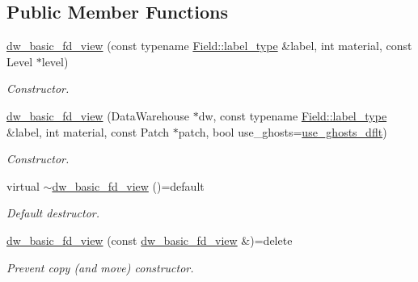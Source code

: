 \subsection*{Public Member Functions}
\begin{DoxyCompactItemize}
\item 
\hyperlink{classUintah_1_1PhaseField_1_1detail_1_1dw__basic__fd__view_3_01ScalarField_3_01T_01_4_00_01STN_00_01VAR_01_4_a23be6debd2588a1c5b9c89996ad9c314}{dw\+\_\+basic\+\_\+fd\+\_\+view} (const typename \hyperlink{structUintah_1_1PhaseField_1_1ScalarField_a7a77875e030da64c47ce9f6c22a06959}{Field\+::label\+\_\+type} \&label, int material, const Level $\ast$level)
\begin{DoxyCompactList}\small\item\em Constructor. \end{DoxyCompactList}\item 
\hyperlink{classUintah_1_1PhaseField_1_1detail_1_1dw__basic__fd__view_3_01ScalarField_3_01T_01_4_00_01STN_00_01VAR_01_4_a07788d6ad4b810e214213f85d543f727}{dw\+\_\+basic\+\_\+fd\+\_\+view} (Data\+Warehouse $\ast$dw, const typename \hyperlink{structUintah_1_1PhaseField_1_1ScalarField_a7a77875e030da64c47ce9f6c22a06959}{Field\+::label\+\_\+type} \&label, int material, const Patch $\ast$patch, bool use\+\_\+ghosts=\hyperlink{classUintah_1_1PhaseField_1_1detail_1_1dw__basic__fd__view_3_01ScalarField_3_01T_01_4_00_01STN_00_01VAR_01_4_a2e418e1016be0d58b9f1fbcaf16f2fa5}{use\+\_\+ghosts\+\_\+dflt})
\begin{DoxyCompactList}\small\item\em Constructor. \end{DoxyCompactList}\item 
virtual \hyperlink{classUintah_1_1PhaseField_1_1detail_1_1dw__basic__fd__view_3_01ScalarField_3_01T_01_4_00_01STN_00_01VAR_01_4_a0b69d6698fd06a7a3654acd778332bf2}{$\sim$dw\+\_\+basic\+\_\+fd\+\_\+view} ()=default
\begin{DoxyCompactList}\small\item\em Default destructor. \end{DoxyCompactList}\item 
\hyperlink{classUintah_1_1PhaseField_1_1detail_1_1dw__basic__fd__view_3_01ScalarField_3_01T_01_4_00_01STN_00_01VAR_01_4_a366783dc41c34d4f1c3f729fb3759df4}{dw\+\_\+basic\+\_\+fd\+\_\+view} (const \hyperlink{classUintah_1_1PhaseField_1_1detail_1_1dw__basic__fd__view}{dw\+\_\+basic\+\_\+fd\+\_\+view} \&)=delete
\begin{DoxyCompactList}\small\item\em Prevent copy (and move) constructor. \end{DoxyCompactList}\item 

\end{DoxyCompactItemize}
